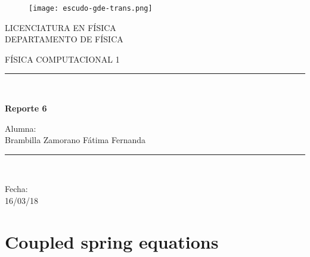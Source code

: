 \documentclass{article}
\begin{document}
\begin{titlepage}
\begin{center}
    \vspace*{-1in}
    \begin{figure}[htb]
    \begin{center}
    \texttt{[image: escudo-gde-trans.png]}
    \end{center}
\end{figure}
\begin{center}
LICENCIATURA EN FÍSICA \\
\vspace*{0.15in}
DEPARTAMENTO DE FÍSICA \\
\vspace*{0.6in}
\begin{large}
FÍSICA COMPUTACIONAL 1 \\
\end{large}
\vspace*{0.2in}
\rule{80mm}{0.1mm}\\
\vspace*{0.1in}
\begin{large}
\textbf{Reporte 6\\ }
\end{large}
\vspace*{0.3in}
\begin{large}
Alumna: \\
\vspace*{0.1in}
Brambilla Zamorano Fátima Fernanda\\
\end{large}
\vspace*{0.3in}
\rule{80mm}{0.1mm}\\
\vspace*{0.1in}
\begin{large}
Fecha: \\ 16/03/18\\
\end{large}
\end{center}
\end{center}
\end{titlepage}

\section{Coupled spring equations}
\end{document}

